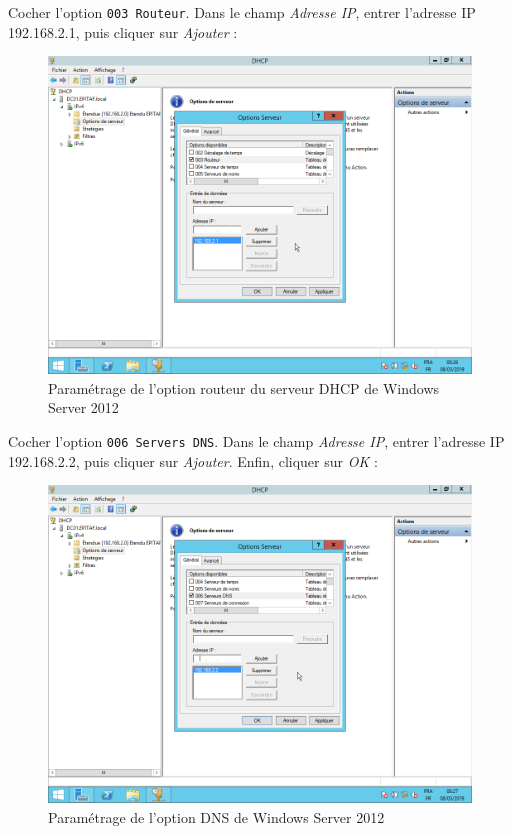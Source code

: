 \newpage
Cocher l'option \texttt{003 Routeur}. Dans le champ \textit{Adresse IP}, entrer l'adresse IP 192.168.2.1, puis cliquer sur \textit{Ajouter} :
\begin{figure}[h!]
    \begin{center}
        \includegraphics[scale=0.6]{WS2012_Screenshots/72.png}
        \caption{Paramétrage de l'option routeur du serveur DHCP de Windows Server 2012}
        \label{WS2012_Screenshots/72}
    \end{center}
\end{figure}
\FloatBarrier

\newpage
Cocher l'option \texttt{006 Servers DNS}. Dans le champ \textit{Adresse IP}, entrer l'adresse IP 192.168.2.2, puis cliquer sur \textit{Ajouter}. Enfin, cliquer sur \textit{OK} :
\begin{figure}[h!]
    \begin{center}
        \includegraphics[scale=0.6]{WS2012_Screenshots/73.png}
        \caption{Paramétrage de l'option DNS de Windows Server 2012}
        \label{WS2012_Screenshots/73}
    \end{center}
\end{figure}
\FloatBarrier


